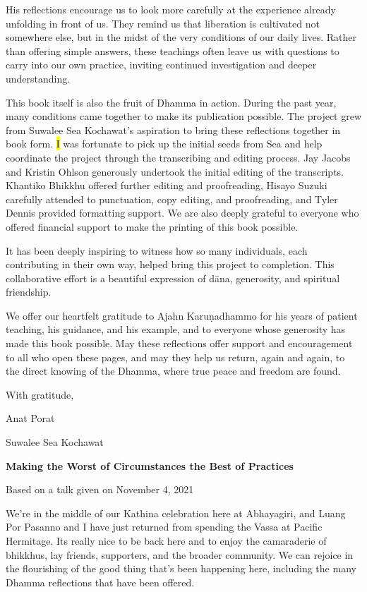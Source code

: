 His reflections encourage us to look more carefully at the experience already unfolding in front of us. They remind us that liberation is cultivated not somewhere else, but in the midst of the very conditions of our daily lives. Rather than offering simple answers, these teachings often leave us with questions to carry into our own practice, inviting continued investigation and deeper understanding.

This book itself is also the fruit of Dhamma in action. During the past year, many conditions came together to make its publication possible. The project grew from Suwalee Sea Kochawat's aspiration to bring these reflections together in book form. \hl{I} was fortunate to pick up the initial seeds from Sea and help coordinate the project through the transcribing and editing process. Jay Jacobs and Kristin Ohlson generously undertook the initial editing of the transcripts. Khantiko Bhikkhu offered further editing and proofreading, Hisayo Suzuki carefully attended to punctuation, copy editing, and proofreading, and Tyler Dennis provided formatting support. We are also deeply grateful to everyone who offered financial support to make the printing of this book possible.

It has been deeply inspiring to witness how so many individuals, each contributing in their own way, helped bring this project to completion. This collaborative effort is a beautiful expression of dāna, generosity, and spiritual friendship.

We offer our heartfelt gratitude to Ajahn Karuṇadhammo for his years of patient teaching, his guidance, and his example, and to everyone whose generosity has made this book possible. May these reflections offer support and encouragement to all who open these pages, and may they help us return, again and again, to the direct knowing of the Dhamma, where true peace and freedom are found.

With gratitude,

Anat Porat

Suwalee Sea Kochawat

\textbf{Making the Worst of Circumstances the Best of Practices}

Based on a talk given on November 4, 2021

We're in the middle of our Kathina celebration here at Abhayagiri, and Luang Por Pasanno and I have just returned from spending the Vassa at Pacific Hermitage. It\textquotesingle s really nice to be back here and to enjoy the camaraderie of bhikkhus, lay friends, supporters, and the broader community. We can rejoice in the flourishing of the good thing that's been happening here, including the many Dhamma reflections that have been offered.

